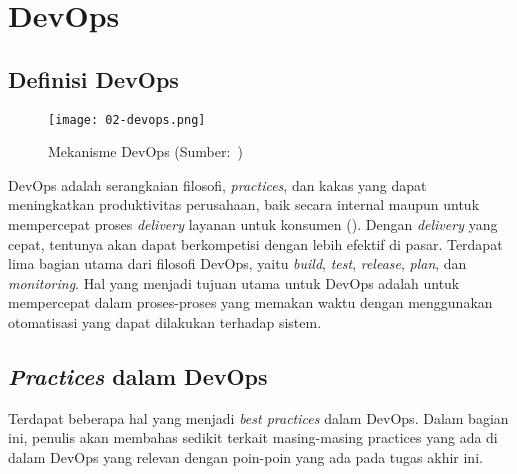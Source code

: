 \section{DevOps}

\subsection{Definisi DevOps}
\begin{figure}[ht]
  \vspace{\baselineskip}
  \centering
  \texttt{[image: 02-devops.png]}
  \caption{Mekanisme DevOps (Sumber:~\cite{devops})}
\end{figure}
DevOps adalah serangkaian filosofi, \textit{practices}, dan kakas yang dapat meningkatkan produktivitas perusahaan, baik secara internal maupun untuk mempercepat proses \textit{delivery} layanan untuk konsumen (\cite{devops}).
Dengan \textit{delivery} yang cepat, tentunya akan dapat berkompetisi dengan lebih efektif di pasar.
Terdapat lima bagian utama dari filosofi DevOps, yaitu \textit{build}, \textit{test}, \textit{release}, \textit{plan}, dan \textit{monitoring}.
Hal yang menjadi tujuan utama untuk DevOps adalah untuk mempercepat dalam proses-proses yang memakan waktu dengan menggunakan otomatisasi yang dapat dilakukan terhadap sistem.

\subsection{\textit{Practices} dalam DevOps}
Terdapat beberapa hal yang menjadi \textit{best practices} dalam DevOps. 
Dalam bagian ini, penulis akan membahas sedikit terkait masing-masing practices yang ada di dalam DevOps yang relevan dengan poin-poin yang ada pada tugas akhir ini.

